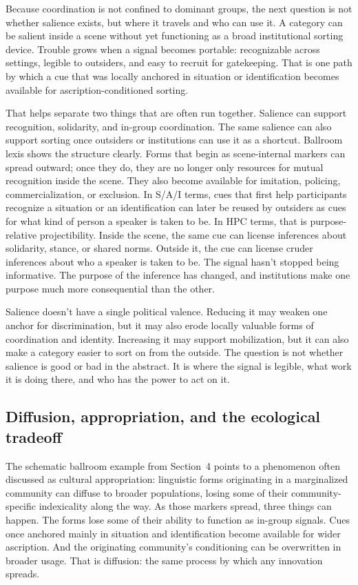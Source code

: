\documentclass[11pt,letterpaper]{article}
\begin{document}
Because coordination is not confined to dominant groups, the next question is not whether salience exists, but where it travels and who can use it. A category can be salient inside a scene without yet functioning as a broad institutional sorting device. Trouble grows when a signal becomes portable: recognizable across settings, legible to outsiders, and easy to recruit for gatekeeping. That is one path by which a cue that was locally anchored in situation or identification becomes available for ascription-conditioned sorting.

That helps separate two things that are often run together. Salience can support recognition, solidarity, and in-group coordination. The same salience can also support sorting once outsiders or institutions can use it as a shortcut. Ballroom lexis shows the structure clearly. Forms that begin as scene-internal markers can spread outward; once they do, they are no longer only resources for mutual recognition inside the scene. They also become available for imitation, policing, commercialization, or exclusion. In S/A/I terms, cues that first help participants recognize a situation or an identification can later be reused by outsiders as cues for what kind of person a speaker is taken to be. In HPC terms, that is purpose-relative projectibility. Inside the scene, the same cue can license inferences about solidarity, stance, or shared norms. Outside it, the cue can license cruder inferences about who a speaker is taken to be. The signal hasn't stopped being informative. The purpose of the inference has changed, and institutions make one purpose much more consequential than the other.

Salience doesn't have a single political valence. Reducing it may weaken one anchor for discrimination, but it may also erode locally valuable forms of coordination and identity. Increasing it may support mobilization, but it can also make a category easier to sort on from the outside. The question is not whether salience is good or bad in the abstract. It is where the signal is legible, what work it is doing there, and who has the power to act on it.

\subsection{Diffusion, appropriation, and the ecological tradeoff}

The schematic ballroom example from Section~4 points to a phenomenon often discussed as cultural appropriation: linguistic forms originating in a marginalized community can diffuse to broader populations, losing some of their community-specific indexicality along the way. As those markers spread, three things can happen. The forms lose some of their ability to function as in-group signals. Cues once anchored mainly in situation and identification become available for wider ascription. And the originating community's conditioning can be overwritten in broader usage. That is diffusion: the same process by which any innovation spreads.
\end{document}
